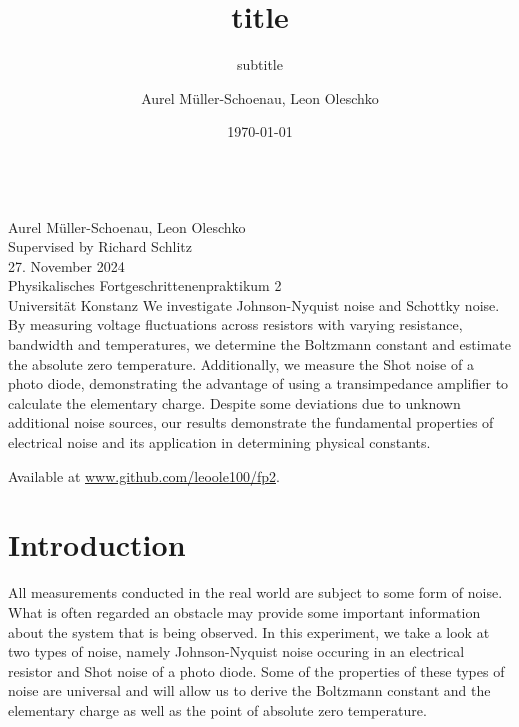 \documentclass[
    parskip=half, 
    twoside=false,
    twocolumn=true,
    fontsize=11pt,
]{scrarticle}
\begin{document}
\title{title}
\subtitle{subtitle}
\author{Aurel Müller-Schoenau, Leon Oleschko}
\date{\dotdate\today}


\begin{titlepage}
    \sffamily
    \vspace*{3cm}
    {
        \fontsize{32}{32}
    }
    \vspace{.25cm}\\
    {
        \Large
        Aurel Müller-Schoenau, Leon Oleschko\\
        Supervised by Richard Schlitz
        \vspace{.05cm}\\
        27. November 2024
        \vspace{.25cm}\\
        \normalsize
        Physikalisches Fortgeschrittenenpraktikum 2\\
        Universität Konstanz
    }
    \vfill
    {
        \normalfont\normalsize
        We investigate Johnson-Nyquist noise and Schottky noise.
        By measuring voltage fluctuations across resistors with varying resistance, bandwidth and temperatures, we determine the Boltzmann constant and estimate the absolute zero temperature. 
        Additionally, we measure the Shot noise of a photo diode, demonstrating the advantage of using a transimpedance amplifier to calculate the elementary charge.
        Despite some deviations due to unknown additional noise sources, our results demonstrate the fundamental properties of electrical noise and its application in determining physical constants.
    }
    \vfill
    \begin{flushright}
        Available at \url{www.github.com/leoole100/fp2}.
    \end{flushright}
\end{titlepage}

\section{Introduction}

All measurements conducted in the real world are subject to some form of noise. What is often regarded an obstacle may provide some important information about the system that is being observed. In this experiment, we take a look at two types of noise, namely Johnson-Nyquist noise occuring in an electrical resistor and Shot noise of a photo diode. Some of the properties of these types of noise are universal and will allow us to derive the Boltzmann constant and the elementary charge as well as the point of absolute zero temperature.
\end{document}
